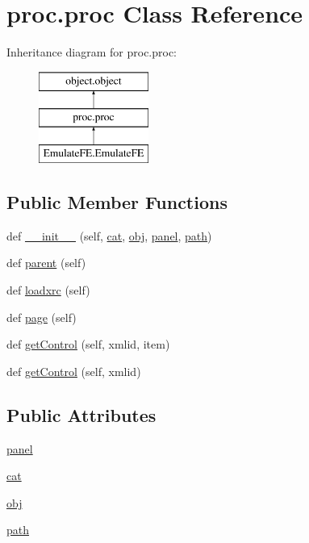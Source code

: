 \hypertarget{classproc_1_1proc}{}\section{proc.\+proc Class Reference}
\label{classproc_1_1proc}
Inheritance diagram for proc.\+proc\+:\begin{figure}[H]
\begin{center}
\leavevmode
\includegraphics[height=3.000000cm]{classproc_1_1proc}
\end{center}
\end{figure}
\subsection*{Public Member Functions}
\begin{DoxyCompactItemize}
\item 
def \hyperlink{classproc_1_1proc_ab5b9673d3e2e83cf26267f39055153f3}{\+\_\+\+\_\+init\+\_\+\+\_\+} (self, \hyperlink{classobject_1_1object_af114388a80cca208c152ffeca0e89e23}{cat}, \hyperlink{classobject_1_1object_a82b61e7cd7e18b1f9de10fc832e5b75e}{obj}, \hyperlink{classproc_1_1proc_a36068ce6d978f4f4dde164e7bdc2e057}{panel}, \hyperlink{classobject_1_1object_a2a518f960961d791b0f900a90c3cd287}{path})
\item 
def \hyperlink{classproc_1_1proc_a997ae1c4cc88dfe9e361897bf471ca0f}{parent} (self)
\item 
def \hyperlink{classproc_1_1proc_a7acf16dcc37aaf46cc783a382ae6bd82}{loadxrc} (self)
\item 
def \hyperlink{classproc_1_1proc_a41bdd5dd3af283e3f0053c1a0c7fa7bf}{page} (self)
\item 
def \hyperlink{classobject_1_1object_a54a55487254a96ed2fe367439c41391f}{get\+Control} (self, xmlid, item)
\item 
def \hyperlink{classobject_1_1object_a22a9d1ff67cd6e990cf1b63ed49c50e4}{get\+Control} (self, xmlid)
\end{DoxyCompactItemize}
\subsection*{Public Attributes}
\begin{DoxyCompactItemize}
\item 
\hyperlink{classproc_1_1proc_a36068ce6d978f4f4dde164e7bdc2e057}{panel}
\item 
\hyperlink{classobject_1_1object_af114388a80cca208c152ffeca0e89e23}{cat}
\item 
\hyperlink{classobject_1_1object_a82b61e7cd7e18b1f9de10fc832e5b75e}{obj}
\item 
\hyperlink{classobject_1_1object_a2a518f960961d791b0f900a90c3cd287}{path}
\end{DoxyCompactItemize}


